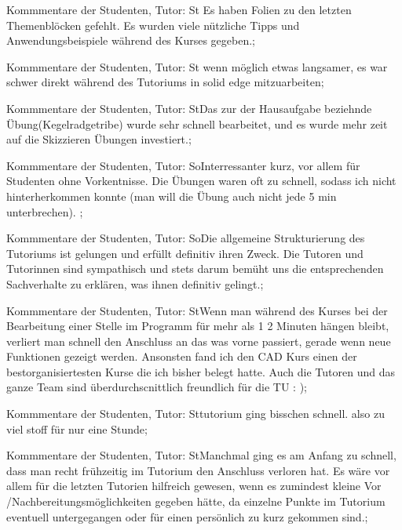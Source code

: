 \documentclass[10pt]{beamer}
\begin{document}
\begin{frame}[fragile]{Kommmentare der Studenten, Tutor: St}  Es haben Folien zu den letzten Themenblöcken gefehlt.   Es wurden viele nützliche Tipps und Anwendungsbeispiele während des Kurses gegeben.;
 \end{frame}
\begin{frame}[fragile]{Kommmentare der Studenten, Tutor: St} wenn möglich etwas langsamer, es war schwer direkt während des Tutoriums in solid edge mitzuarbeiten;
 \end{frame}
\begin{frame}[fragile]{Kommmentare der Studenten, Tutor: St}Das zur der Hausaufgabe beziehnde Übung(Kegelradgetribe) wurde sehr schnell bearbeitet, und es wurde mehr zeit auf die Skizzieren Übungen investiert.;
 \end{frame}
\begin{frame}[fragile]{Kommmentare der Studenten, Tutor: So}Interressanter kurz, vor allem für Studenten ohne Vorkentnisse. Die Übungen waren oft zu schnell, sodass ich nicht hinterherkommen konnte (man will die Übung auch nicht jede 5 min unterbrechen). ;
 \end{frame}
\begin{frame}[fragile]{Kommmentare der Studenten, Tutor: So}Die allgemeine Strukturierung des Tutoriums ist gelungen und erfüllt definitiv ihren Zweck. Die Tutoren und Tutorinnen sind sympathisch und stets darum bemüht uns die entsprechenden Sachverhalte zu erklären, was ihnen definitiv gelingt.;
 \end{frame}
\begin{frame}[fragile]{Kommmentare der Studenten, Tutor: St}Wenn man während des Kurses bei der Bearbeitung einer Stelle im Programm für mehr als 1 2 Minuten hängen bleibt, verliert man schnell den Anschluss an das was vorne passiert, gerade wenn neue Funktionen gezeigt werden. Ansonsten fand ich den CAD Kurs einen der bestorganisiertesten Kurse die ich bisher belegt hatte. Auch die Tutoren und das ganze Team sind überdurchscnittlich freundlich für die TU : );
 \end{frame}
\begin{frame}[fragile]{Kommmentare der Studenten, Tutor: St}tutorium ging bisschen schnell. also zu viel stoff für nur eine Stunde;
 \end{frame}
\begin{frame}[fragile]{Kommmentare der Studenten, Tutor: St}Manchmal ging es am Anfang zu schnell, dass man recht frühzeitig im Tutorium den Anschluss verloren hat.  Es wäre vor allem für die letzten Tutorien hilfreich gewesen, wenn es zumindest kleine Vor /Nachbereitungsmöglichkeiten gegeben hätte, da einzelne Punkte im Tutorium eventuell untergegangen oder für einen persönlich zu kurz gekommen sind.;
 \end{frame}
\end{document}
